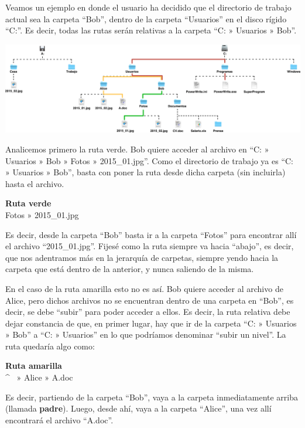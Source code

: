 Veamos un ejemplo en donde el usuario ha decidido que el directorio de trabajo
actual sea la carpeta ``Bob'', dentro de la carpeta ``Usuarios'' en el disco
rígido ``C:''. Es decir, todas las rutas serán relativas a la carpeta
``C: » Usuarios » Bob''.

\vspace{0.5cm}
\centerline{\includegraphics[scale=0.35]{capitulos/informatica/imagenes/directorios_windows_3.png}}

Analicemos primero la ruta verde. Bob quiere acceder al archivo en ``C: » Usuarios
» Bob » Fotos » 2015\_01.jpg''. Como el directorio de trabajo ya es ``C: » Usuarios » Bob'',
basta con poner la ruta desde dicha carpeta (sin incluirla) hasta el archivo.

\begin{example}
    \textbf{Ruta verde}\\
    Fotos » 2015\_01.jpg
\end{example}

Es decir, desde la carpeta ``Bob'' basta ir a la carpeta ``Fotos'' para encontrar
allí el archivo ``2015\_01.jpg''. Fijesé como la ruta siempre va hacia ``abajo'',
es decir, que nos adentramos más en la jerarquía de carpetas, siempre yendo hacia
la carpeta que está dentro de la anterior, y nunca saliendo de la misma.

En el caso de la ruta amarilla esto no es así. Bob quiere acceder al archivo de Alice,
pero dichos archivos no se encuentran dentro de una carpeta en ``Bob'', es decir,
se debe ``subir'' para poder acceder a ellos. Es decir, la ruta relativa debe
dejar constancia de que, en primer lugar, hay que ir de la carpeta ``C: » Usuarios
» Bob'' a ``C: » Usuarios'' en lo que podríamos denominar ``subir un nivel''. La
ruta quedaría algo como:

\begin{example}
    \textbf{Ruta amarilla}\\
    \textasciicircum ~ » Alice » A.doc
\end{example}

Es decir, partiendo de la carpeta ``Bob'', vaya a la carpeta inmediatamente
arriba (llamada \textbf{padre}). Luego, desde ahí, vaya a la carpeta ``Alice'',
una vez allí encontrará el archivo ``A.doc''.

